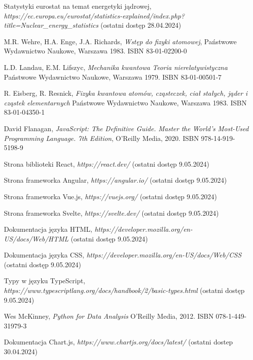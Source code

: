 \documentclass{SGGW-thesis}
\begin{document}
\begin{thebibliography}{9}
	Statystyki eurostat na temat energetyki jądrowej, 
	\textit{https://ec.europa.eu/eurostat/statistics-explained/index.php?title=Nuclear\_energy\_statistics}
	(ostatni dostęp 28.04.2024)

	M.R. Wehre, H.A. Enge, J.A. Richards,
	\textit{Wstęp do fizyki atomowej}, 
	Państwowe Wydawnictwo Naukowe, Warszawa 1983. ISBN 83-01-02200-0
	
	L.D. Landau, E.M. Lifszyc,
	\textit{Mechanika kwantowa Teoria nierelatywistyczna}
	Państwowe Wydawnictwo Naukowe, Warszawa 1979. ISBN 83-01-00501-7
	
	R. Eisberg, R. Resnick,
	\textit{Fizyka kwantowa atomów, cząsteczek, ciał stałych, jąder i cząstek elementarnych}
	Państwowe Wydawnictwo Naukowe, Warszawa 1983. ISBN 83-01-04350-1

	David Flanagan, 
	\textit{JavaScript: The Definitive Guide. Master the World's Most-Used Programming Language. 7th Edition}, 
	O'Reilly Media, 2020. ISBN 978-14-919-5198-9
	
	Strona biblioteki React,
	\textit{https://react.dev/}
	(ostatni dostęp 9.05.2024)
	
	Strona frameworka Angular,
	\textit{https://angular.io/}
	(ostatni dostęp 9.05.2024)
	
	Strona frameworka Vue.js,
	\textit{https://vuejs.org/}
	(ostatni dostęp 9.05.2024)
	
	Strona frameworka Svelte,
	\textit{https://svelte.dev/}
	(ostatni dostęp 9.05.2024)
	
	Dokumentacja języka HTML,
	\textit{https://developer.mozilla.org/en-US/docs/Web/HTML}
	(ostatni dostęp 9.05.2024)
	
	Dokumentacja języka CSS,
	\textit{https://developer.mozilla.org/en-US/docs/Web/CSS}
	(ostatni dostęp 9.05.2024)
	
	Typy w języku TypeScript,
	\textit{https://www.typescriptlang.org/docs/handbook/2/basic-types.html}
	(ostatni dostęp 9.05.2024)
	
	Wes McKinney, 
	\textit{Python for Data Analysis}
	O'Reilly Media, 2012. ISBN 078-1-449-31979-3
	
	Dokumentacja Chart.js, 
	\textit{https://www.chartjs.org/docs/latest/}
	(ostatni dostep 30.04.2024)
	

\end{thebibliography}
\end{document}
